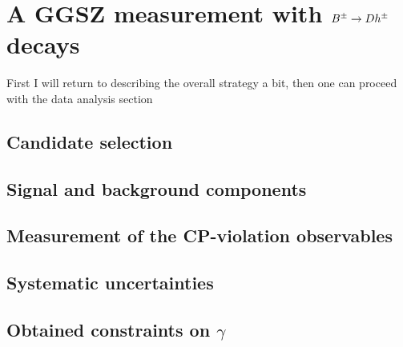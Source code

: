 

\chapter{\texorpdfstring{A GGSZ measurement with ${{B}^\pm}\rightarrow{\ensuremath{D}} h^\pm$ decays}{A GGSZ measurement with B->Dh decays}}
\label{ch:5-GGSZ-measurement}


First I will return to describing the overall strategy a bit, then one can proceed with the data analysis section

\section{Candidate selection} %
\label{sec:candidate_selection}


\section{Signal and background components} %
\label{sec:signal_and_background_components}


\section{Measurement of the CP-violation observables} %
\label{sec:measurement_of_the_cp_violation_observables}


\section{Systematic uncertainties} %
\label{sec:systematic_uncertainties}


\section{\texorpdfstring{Obtained constraints on $\gamma$}{Obtained constraints on gamma}} %
\label{sec:constraints_on_gamma}




